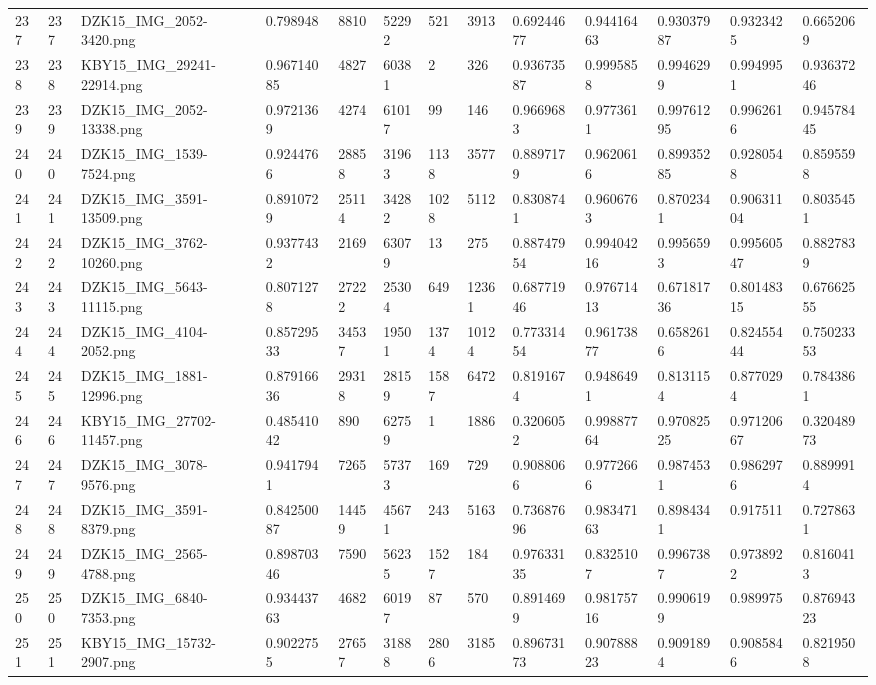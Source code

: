 \documentclass[11pt, a4paper, twoside]{report}
\begin{document}
\begin{longtable}[c]{@{}lllllllllllll@{}}
237 & 237 & DZK15\_IMG\_2052-3420.png & 0.798948 & 8810 & 52292 & 521 & 3913 & 0.69244677 & 0.94416463 & 0.93037987 & 0.9323425 & 0.6652069 \\
238 & 238 & KBY15\_IMG\_29241-22914.png & 0.96714085 & 4827 & 60381 & 2 & 326 & 0.93673587 & 0.9995858 & 0.9946299 & 0.9949951 & 0.93637246 \\
239 & 239 & DZK15\_IMG\_2052-13338.png & 0.9721369 & 4274 & 61017 & 99 & 146 & 0.9669683 & 0.9773611 & 0.99761295 & 0.9962616 & 0.94578445 \\
240 & 240 & DZK15\_IMG\_1539-7524.png & 0.9244766 & 28858 & 31963 & 1138 & 3577 & 0.8897179 & 0.9620616 & 0.89935285 & 0.9280548 & 0.8595598 \\
241 & 241 & DZK15\_IMG\_3591-13509.png & 0.8910729 & 25114 & 34282 & 1028 & 5112 & 0.8308741 & 0.9606763 & 0.8702341 & 0.90631104 & 0.8035451 \\
242 & 242 & DZK15\_IMG\_3762-10260.png & 0.9377432 & 2169 & 63079 & 13 & 275 & 0.88747954 & 0.99404216 & 0.9956593 & 0.99560547 & 0.8827839 \\
243 & 243 & DZK15\_IMG\_5643-11115.png & 0.8071278 & 27222 & 25304 & 649 & 12361 & 0.68771946 & 0.97671413 & 0.67181736 & 0.80148315 & 0.67662555 \\
244 & 244 & DZK15\_IMG\_4104-2052.png & 0.85729533 & 34537 & 19501 & 1374 & 10124 & 0.77331454 & 0.96173877 & 0.6582616 & 0.82455444 & 0.75023353 \\
245 & 245 & DZK15\_IMG\_1881-12996.png & 0.87916636 & 29318 & 28159 & 1587 & 6472 & 0.8191674 & 0.9486491 & 0.8131154 & 0.8770294 & 0.7843861 \\
246 & 246 & KBY15\_IMG\_27702-11457.png & 0.48541042 & 890 & 62759 & 1 & 1886 & 0.3206052 & 0.99887764 & 0.97082525 & 0.97120667 & 0.32048973 \\
247 & 247 & DZK15\_IMG\_3078-9576.png & 0.9417941 & 7265 & 57373 & 169 & 729 & 0.9088066 & 0.9772666 & 0.9874531 & 0.9862976 & 0.8899914 \\
248 & 248 & DZK15\_IMG\_3591-8379.png & 0.84250087 & 14459 & 45671 & 243 & 5163 & 0.73687696 & 0.98347163 & 0.8984341 & 0.917511 & 0.7278631 \\
249 & 249 & DZK15\_IMG\_2565-4788.png & 0.89870346 & 7590 & 56235 & 1527 & 184 & 0.97633135 & 0.8325107 & 0.9967387 & 0.9738922 & 0.8160413 \\
250 & 250 & DZK15\_IMG\_6840-7353.png & 0.93443763 & 4682 & 60197 & 87 & 570 & 0.8914699 & 0.98175716 & 0.9906199 & 0.989975 & 0.87694323 \\
251 & 251 & KBY15\_IMG\_15732-2907.png & 0.9022755 & 27657 & 31888 & 2806 & 3185 & 0.89673173 & 0.90788823 & 0.9091894 & 0.9085846 & 0.8219508 \\

\end{longtable}
\end{document}
